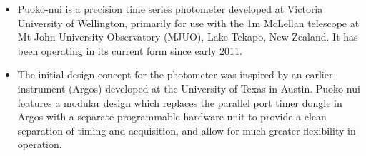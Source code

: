 \vspace{-1.75cm}
\begin{itemize}[itemsep=20pt]
\item[] Puoko-nui is a precision time series photometer developed at Victoria
University of Wellington, primarily for use with the 1m McLellan
telescope at Mt John University Observatory (MJUO), Lake Tekapo, New Zealand.
It has been operating in its current form since early 2011.

\item[] The initial design concept for the photometer was inspired by an
earlier instrument (Argos) developed at the University of Texas in Austin.
Puoko-nui features a modular design which replaces the parallel port timer
dongle in Argos with a separate programmable hardware unit to provide a clean
separation of timing and acquisition, and allow for much greater flexibility
in operation.

\end{itemize}
\vspace{-1.75cm}